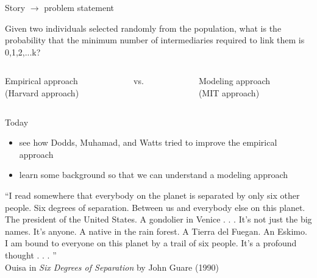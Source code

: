\documentclass[aspectratio=169]{beamer}
\begin{document}
\begin{frame}

Story $\rightarrow$ problem statement

\end{frame}
\begin{frame}

Given two individuals selected randomly from the population, what is the probability that the minimum number of intermediaries required to link them is 0,1,2,...k?

\end{frame}
\begin{frame}

\begin{center}
\begin{columns}
\begin{column}{0.4\textwidth}
Empirical approach\\(Harvard approach)
\end{column}
\begin{column}{0.2\textwidth}
vs.
\end{column}
\begin{column}{0.4\textwidth}
Modeling approach\\(MIT approach)
\end{column}
\end{columns}
\end{center}

\pause
\vfill
Today
\begin{itemize}
\item see how Dodds, Muhamad, and Watts tried to improve the empirical approach
\item learn some background so that we can understand a modeling approach
\end{itemize}

\end{frame}
\begin{frame}

``I read somewhere that everybody on the planet is separated by only six other people.  Six degrees of separation.  Between us and everybody else on this planet.  The president of the United States.  A gondolier in Venice . . . It's not just the big names.  It's anyone.  A native in the rain forest.  A Tierra del Fuegan.  An Eskimo.  I am bound to everyone on this planet by a trail of six people.  It's a profound thought . . . ''\\
Ouisa in \textit{Six Degrees of Separation} by John Guare (1990)


\end{frame}
\end{document}
